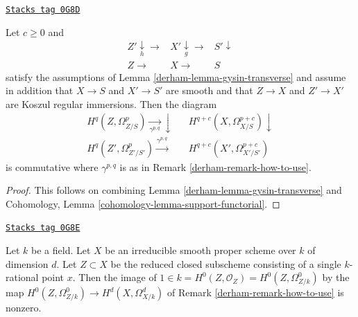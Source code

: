 \begin{lemma}
\label{derham-lemma-gysin-transverse-global}
\href{https://stacks.math.columbia.edu/tag/0G8D}{\texttt{Stacks tag 0G8D}}

Let $c \geq 0$ and
$$
\begin{array}{ccc}Z' \underset{h}{\downarrow}\longrightarrow & X' \underset{g}{\downarrow}\longrightarrow & S' \downarrow \\ Z \longrightarrow & X \longrightarrow & S\end{array}
$$
satisfy the assumptions of Lemma \ref{derham-lemma-gysin-transverse} and assume
in addition that $X \to S$ and $X' \to S'$ are smooth and that
$Z \to X$ and $Z' \to X'$ are Koszul regular immersions.
Then the diagram
$$
\begin{array}{ccc}H^q(Z, \Omega^p_{Z/S}) \underset{\gamma^{p, q}}{\longrightarrow}\downarrow &  & H^{q + c}(X, \Omega^{p + c}_{X/S}) \downarrow \\ H^q(Z', \Omega^p_{Z'/S'}) \overset{\gamma^{p, q}}{\longrightarrow} &  & H^{q + c}(X', \Omega^{p + c}_{X'/S'})\end{array}
$$
is commutative where $\gamma^{p, q}$ is as in Remark \ref{derham-remark-how-to-use}.
\end{lemma}

\begin{proof}

This follows on combining Lemma \ref{derham-lemma-gysin-transverse}
and Cohomology, Lemma \ref{cohomology-lemma-support-functorial}.
\end{proof}

\begin{lemma}
\label{derham-lemma-class-of-a-point}
\href{https://stacks.math.columbia.edu/tag/0G8E}{\texttt{Stacks tag 0G8E}}

Let $k$ be a field. Let $X$ be an irreducible smooth proper scheme over $k$
of dimension $d$. Let $Z \subset X$ be the reduced closed subscheme consisting
of a single $k$-rational point $x$. Then the image of
$1 \in k = H^0(Z, \mathcal{O}_Z) = H^0(Z, \Omega^0_{Z/k})$
by the map $H^0(Z, \Omega^0_{Z/k}) \to H^d(X, \Omega^d_{X/k})$
of Remark \ref{derham-remark-how-to-use} is nonzero.
\end{lemma}

